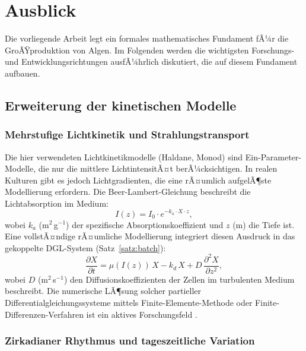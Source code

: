﻿\documentclass[a4paper,12pt]{article}
\theoremstyle{definition}
\begin{document}
\section{Ausblick}

Die vorliegende Arbeit legt ein formales mathematisches Fundament fÃ¼r die
GroÃŸproduktion von Algen. Im Folgenden werden die wichtigsten Forschungs- und
Entwicklungsrichtungen ausfÃ¼hrlich diskutiert, die auf diesem Fundament aufbauen.

\subsection{Erweiterung der kinetischen Modelle}

\subsubsection{Mehrstufige Lichtkinetik und Strahlungstransport}

Die hier verwendeten Lichtkinetikmodelle (Haldane, Monod) sind Ein-Parameter-Modelle,
die nur die mittlere LichtintensitÃ¤t berÃ¼cksichtigen. In realen Kulturen gibt es
jedoch Lichtgradienten, die eine rÃ¤umlich aufgelÃ¶ste Modellierung erfordern.
Die Beer-Lambert-Gleichung beschreibt die Lichtabsorption im Medium:
\[
	I(z) = I_0 \cdot e^{-k_a \cdot X \cdot z},
\]
wobei $k_a$ (m$^2$\,g$^{-1}$) der spezifische Absorptionskoeffizient und $z$ (m)
die Tiefe ist. Eine vollstÃ¤ndige rÃ¤umliche Modellierung integriert diesen
Ausdruck in das gekoppelte DGL-System (Satz~\ref{satz:batch}):
\[
	\frac{\partial X}{\partial t} = \mu(I(z))\,X - k_d\,X + D\,\frac{\partial^2 X}{\partial z^2},
\]
wobei $D$ (m$^2$\,s$^{-1}$) den Diffusionskoeffizienten der Zellen im
turbulenten Medium beschreibt. Die numerische LÃ¶sung solcher partieller
Differentialgleichungssysteme mittels Finite-Elemente-Methode oder
Finite-Differenzen-Verfahren ist ein aktives Forschungsfeld
\cite{richmond2004,cornet1998}.

\subsubsection{Zirkadianer Rhythmus und tageszeitliche Variation}
\end{document}
